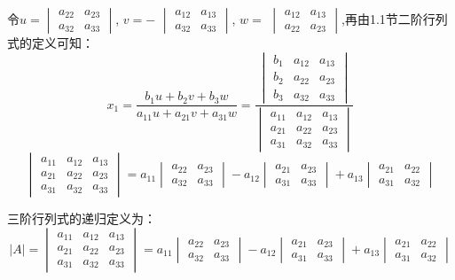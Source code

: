 \documentclass[lang=cn,newtx,10pt,scheme=chinese,thmcnt=section]{elegantbook}
\numberwithin{equation}{section}
\begin{document}
令$u=$$\begin{vmatrix}a_{22} & a_{23} \\ a_{32} & a_{33}\end{vmatrix}$, $v=-$ $\begin{vmatrix}a_{12} & a_{13} \\ a_{32} & a_{33}\end{vmatrix}$, $w=$ $\begin{vmatrix}a_{12} & a_{13} \\ a_{22} & a_{23}\end{vmatrix}$,再由1.1节二阶行列式的定义可知：
\[
x_1=\frac{b_1u + b_2v + b_3w}{a_{11}u + a_{21}v + a_{31}w} = \frac{\begin{vmatrix}b_1 & a_{12} & a_{13} \\ b_2 & a_{22} & a_{23} \\ b_3 & a_{32} & a_{33}\end{vmatrix}}{\begin{vmatrix}a_{11} & a_{12} & a_{13} \\ a_{21} & a_{22} & a_{23} \\ a_{31} & a_{32} & a_{33}\end{vmatrix}}
\]
\[
\begin{vmatrix}
    a_{11} & a_{12} & a_{13} \\ a_{21} & a_{22} & a_{23} \\ a_{31} & a_{32} & a_{33} 
\end{vmatrix} = a_{11}\begin{vmatrix}a_{22} & a_{23} \\ a_{32} & a_{33}\end{vmatrix} - a_{12}\begin{vmatrix}a_{21} & a_{23} \\ a_{31} & a_{33}\end{vmatrix} + a_{13}\begin{vmatrix}a_{21} & a_{22} \\ a_{31} & a_{32}\end{vmatrix}
\]
\begin{definition}
    三阶行列式的递归定义为：
    \[|A| = 
    \begin{vmatrix}
    a_{11} & a_{12} & a_{13} \\
    a_{21} & a_{22} & a_{23} \\
    a_{31} & a_{32} & a_{33}
    \end{vmatrix}
    = a_{11}\begin{vmatrix}a_{22} & a_{23} \\ a_{32} & a_{33}\end{vmatrix} - a_{12}\begin{vmatrix}a_{21} & a_{23} \\ a_{31} & a_{33}\end{vmatrix} + a_{13}\begin{vmatrix}a_{21} & a_{22} \\ a_{31} & a_{32}\end{vmatrix}
    \]
\end{definition}
\newpage
\end{document}
